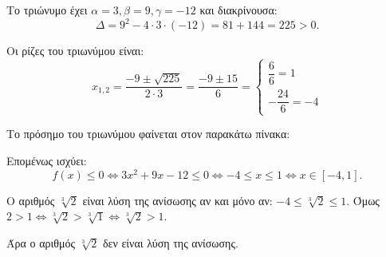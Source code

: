 
\begin{alist}
\item Το τριώνυμο έχει $\alpha = 3, \beta = 9, \gamma = -12$ και διακρίνουσα:
\[\Delta = 9^2 - 4 \cdot 3 \cdot (-12) = 81 + 144 = 225 > 0.\]

Οι ρίζες του τριωνύμου είναι:
\[x_{1,2} = \dfrac{-9 \pm \sqrt{225}}{2 \cdot 3} = \dfrac{-9 \pm 15}{6} = \begin{cases} \dfrac{6}{6} = 1 \\ -\dfrac{24}{6} = -4 \end{cases}\]

Το πρόσημο του τριωνύμου φαίνεται στον παρακάτω πίνακα:
\begin{center}
\end{center}

Επομένως ισχύει:
\[f(x) \le 0 \Leftrightarrow 3x^2 + 9x - 12 \le 0 \Leftrightarrow -4 \le x \le 1 \Leftrightarrow x \in [-4, 1].\]

\item Ο αριθμός $\sqrt[3]{2}$ είναι λύση της ανίσωσης αν και μόνο αν:
$-4 \le \sqrt[3]{2} \le 1$.
Όμως $2 > 1 \Leftrightarrow \sqrt[3]{2} > \sqrt[3]{1} \Leftrightarrow \sqrt[3]{2} > 1$.

Άρα ο αριθμός $\sqrt[3]{2}$ δεν είναι λύση της ανίσωσης.
\end{alist}

